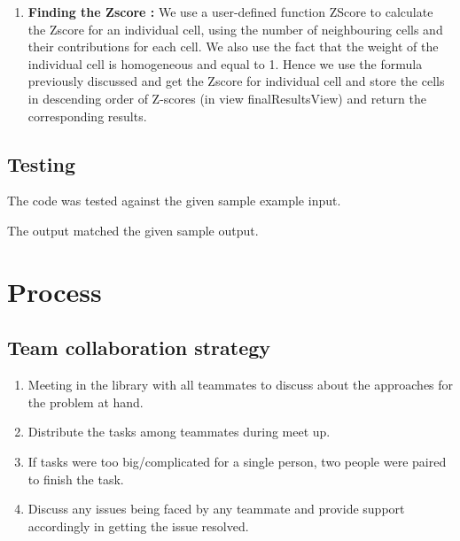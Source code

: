 \begin{enumerate}
    \item \textbf{Finding the Zscore :} We use a user-defined function ZScore to calculate the Zscore for an individual cell, using the number of neighbouring cells and their contributions for each cell. We also use the fact that the weight of the individual cell is homogeneous and equal to 1. Hence we use the formula previously discussed and get the Zscore for individual cell and store the cells in descending order of Z-scores (in view finalResultsView) and return the corresponding results.
\end{enumerate}

\subsection{Testing}
The code was tested against the given sample example input.


The output matched the given sample output.

\newpage

\section{Process}

\subsection{Team collaboration strategy}
\begin{enumerate}
    \item Meeting in the library with all teammates to discuss about the approaches for the problem at hand.
    \item Distribute the tasks among teammates during meet up. 
    \item If tasks were too big/complicated for a single person, two people were paired to finish the task.
    \item Discuss any issues being faced by any teammate and provide support accordingly in getting the issue resolved.
\end{enumerate}

